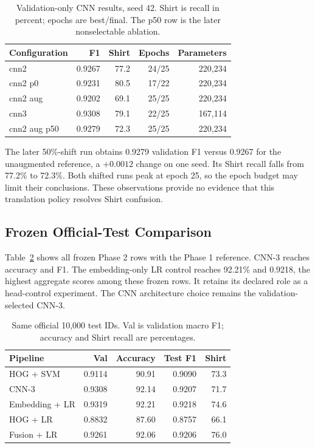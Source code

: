 \documentclass[conference]{IEEEtran}
\begin{document}
\begin{table}[t]
\caption{Validation-only CNN results, seed 42. Shirt is recall in percent;
epochs are best/final. The p50 row is the later nonselectable ablation.}
\label{tab:ablations}
\centering\scriptsize
\begin{tabular}{lrrrr}
\toprule
Configuration & F1 & Shirt & Epochs & Parameters\\
\midrule
cnn2 & 0.9267 & 77.2 & 24/25 & 220,234 \\
cnn2 p0 & 0.9231 & 80.5 & 17/22 & 220,234 \\
cnn2 aug & 0.9202 & 69.1 & 25/25 & 220,234 \\
cnn3 & 0.9308 & 79.1 & 22/25 & 167,114 \\
cnn2 aug p50 & 0.9279 & 72.3 & 25/25 & 220,234 \\
\bottomrule
\end{tabular}
\end{table}

The later 50\%-shift run obtains 0.9279 validation F1 versus 0.9267 for the
unaugmented reference, a $+0.0012$ change on one seed. Its Shirt recall falls
from 77.2\% to 72.3\%. Both shifted runs peak at epoch 25, so the epoch budget
may limit their conclusions. These observations provide no evidence that this
translation policy resolves Shirt confusion.

\subsection{Frozen Official-Test Comparison}
Table~\ref{tab:comparison} shows all frozen Phase 2 rows with the Phase 1 reference.
CNN-3 reaches \CnnAccuracy{} accuracy and \CnnFone{} F1. The embedding-only LR
control reaches 92.21\% and 0.9218, the highest aggregate scores among these
frozen rows. It retains its declared role as a head-control experiment. The
CNN architecture choice remains the validation-selected CNN-3.

\begin{table}[t]
\caption{Same official 10,000 test IDs. Val is validation macro F1; accuracy
and Shirt recall are percentages.}
\label{tab:comparison}
\centering\small
\begin{tabular}{lrrrr}
\toprule
Pipeline & Val & Accuracy & Test F1 & Shirt\\
\midrule
HOG + SVM & 0.9114 & 90.91 & 0.9090 & 73.3 \\
CNN-3 & 0.9308 & 92.14 & 0.9207 & 71.7 \\
Embedding + LR & 0.9319 & 92.21 & 0.9218 & 74.6 \\
HOG + LR & 0.8832 & 87.60 & 0.8757 & 66.1 \\
Fusion + LR & 0.9261 & 92.06 & 0.9206 & 76.0 \\
\bottomrule
\end{tabular}
\end{table}
\end{document}
